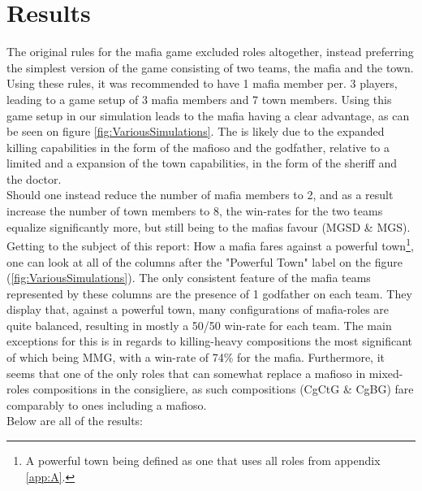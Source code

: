 \section{Results}\label{sec:results}
The original rules for the mafia game excluded roles altogether, instead 
preferring the simplest version of the game consisting of two teams, the mafia 
and the town. Using these rules, it was recommended to have 1 mafia member per. 
3 players, leading to a game setup of 3 mafia members and 7 town 
members\cite{MafiaRules}. Using this game setup in our simulation leads to the 
mafia having a clear advantage, as can be seen on figure 
\ref{fig:VariousSimulations}. The is likely due to the expanded killing 
capabilities in the form of the mafioso and the godfather, relative to a 
limited and a expansion of the town capabilities, in the form of the sheriff 
and the doctor. \\
Should one instead reduce the number of mafia members to 2, and as a result 
increase the number of town members to 8, the win-rates for the two teams 
equalize significantly more, but still being to the mafias favour (MGSD \& 
MGS).\\
Getting to the subject of this report: How a mafia fares against a powerful 
town\footnote{A powerful town being defined as one that uses all roles 
from 
appendix \ref{app:A}.}, one can look at all of the columns after the "Powerful 
Town" label on the figure (\ref{fig:VariousSimulations}). The only consistent 
feature of the mafia teams represented by these columns are the presence of 1 
godfather on each team. They display that, against a powerful town, many 
configurations of mafia-roles are quite balanced, resulting in mostly a 50/50 
win-rate for each team. The main exceptions for this is in regards to 
killing-heavy compositions the most significant of which being MMG, with a 
win-rate of 74\% for the mafia. Furthermore, it seems that one of the only 
roles that can somewhat replace a mafioso in mixed-roles compositions in the 
consigliere, as such compositions (CgCtG \& CgBG) fare comparably to ones 
including a mafioso. \\
Below are all of the results:

